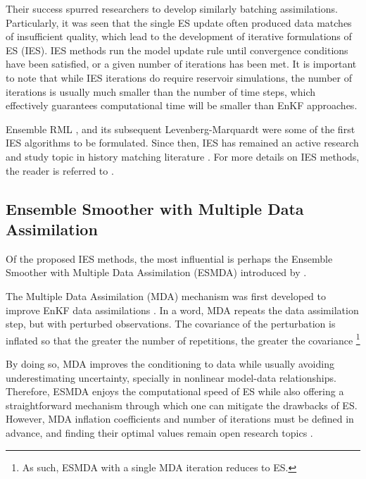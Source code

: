 Their success spurred researchers to develop similarly batching assimilations.
Particularly, it was seen that the single ES update often produced data matches of insufficient quality,
which lead to the development of iterative formulations of ES (IES).
%
IES methods run the model update rule until convergence conditions have been satisfied, 
or a given number of iterations has been met.
%
It is important to note that while IES iterations do require reservoir simulations, 
the number of iterations is usually much smaller than the number of time steps,
which effectively guarantees computational time will be smaller than EnKF approaches.

Ensemble RML \cite{Chen:2012}, 
and its subsequent Levenberg-Marquardt \cite{Chen:2013}
were some of the first IES algorithms to be formulated.
%
Since then, IES has remained an active research and study topic in history matching literature
\cite{Luo:2015, Zhang:2018, Raanes:2019, Maschio:2024}.
For more details on IES methods, the reader is referred to 
.

\subsection{Ensemble Smoother with Multiple Data Assimilation}

Of the proposed IES methods, the most influential is perhaps the 
Ensemble Smoother with Multiple Data Assimilation (ESMDA) 
introduced by .

The Multiple Data Assimilation (MDA) mechanism was 
first developed to improve EnKF data assimilations
\cite{Emerick:2012}.
%
In a word, MDA repeats the data assimilation step, but with perturbed observations.
The covariance of the perturbation is inflated so that the greater the number of repetitions,
the greater the covariance%
\footnote{%
    As such, ESMDA with a single MDA iteration reduces to ES.
}

By doing so, MDA improves the conditioning to data while usually avoiding underestimating uncertainty,
specially in nonlinear model-data relationships.
%
Therefore, ESMDA enjoys the computational speed of ES while also offering a 
straightforward mechanism through which one can mitigate the drawbacks of ES.
%
However, MDA inflation coefficients and number of iterations must be defined in advance,
and finding their optimal values remain open research topics
\cite[subsection 5.3.5]{Emerick:2025}.

